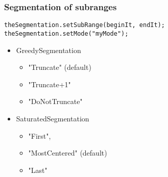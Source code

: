 \begin{frame}[fragile]
  \frametitle{Segmentation of subranges}

  \begin{verbatim}
theSegmentation.setSubRange(beginIt, endIt);
theSegmentation.setMode("myMode");
  \end{verbatim}

\begin{itemize}
 \item GreedySegmentation
  \begin{itemize}
   \item \alert<1>{"Truncate" (default)}
   \item "Truncate+1"
   \item "DoNotTruncate"
  \end{itemize}
 \item SaturatedSegmentation
  \begin{itemize}
   \item "First",
   \item \alert<2>{"MostCentered" (default)}
   \item "Last"
  \end{itemize}
\end{itemize}


\end{frame}

